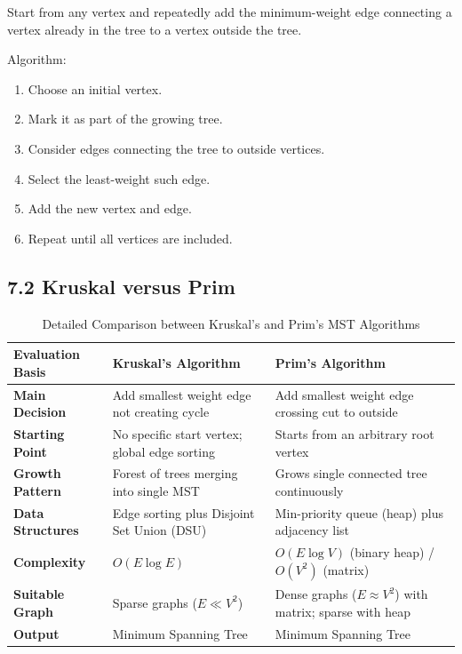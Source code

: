 Start from any vertex and repeatedly add the minimum-weight edge connecting a vertex already in the tree to a vertex outside the tree.

Algorithm:

\begin{enumerate}
    \item Choose an initial vertex.
    \item Mark it as part of the growing tree.
    \item Consider edges connecting the tree to outside vertices.
    \item Select the least-weight such edge.
    \item Add the new vertex and edge.
    \item Repeat until all vertices are included.
\end{enumerate}

\subsection{7.2 Kruskal versus Prim}

\begin{table}[htbp]
\centering
\caption{Detailed Comparison between Kruskal's and Prim's MST Algorithms}
\label{tab:kruskal_vs_prim}
\begin{tabularx}{\textwidth}{p{3.5cm} X X}
\toprule
\textbf{Evaluation Basis} & \textbf{Kruskal's Algorithm} & \textbf{Prim's Algorithm} \\
\midrule
\textbf{Main Decision} & Add smallest weight edge not creating cycle & Add smallest weight edge crossing cut to outside \\
\textbf{Starting Point} & No specific start vertex; global edge sorting & Starts from an arbitrary root vertex \\
\textbf{Growth Pattern} & Forest of trees merging into single MST & Grows single connected tree continuously \\
\textbf{Data Structures} & Edge sorting plus Disjoint Set Union (DSU) & Min-priority queue (heap) plus adjacency list \\
\textbf{Complexity} & $O(E \log E)$ & $O(E \log V)$ (binary heap) / $O(V^2)$ (matrix) \\
\textbf{Suitable Graph} & Sparse graphs ($E \ll V^2$) & Dense graphs ($E \approx V^2$) with matrix; sparse with heap \\
\textbf{Output} & Minimum Spanning Tree & Minimum Spanning Tree \\
\bottomrule
\end{tabularx}
\end{table}

